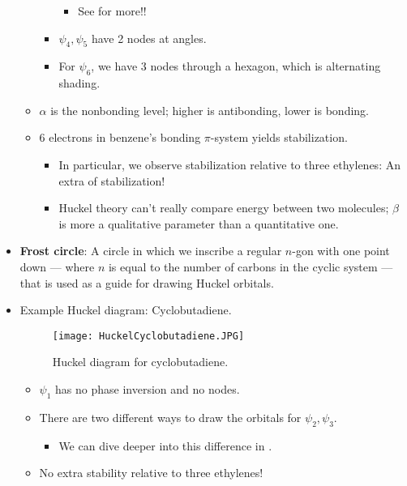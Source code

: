 \documentclass[../notes.tex]{subfiles}
\begin{document}
\begin{itemize}
\begin{itemize}
\begin{itemize}
            \begin{itemize}
                \item See \textcite{bib:Anslyn} for more!!
            \end{itemize}
            \item $\psi_4,\psi_5$ have 2 nodes at angles.
            \item For $\psi_6$, we have 3 nodes through a hexagon, which is alternating shading.
        \end{itemize}
        \item $\alpha$ is the nonbonding level; higher is antibonding, lower is bonding.
        \item 6 electrons in benzene's bonding $\pi$-system yields stabilization.
        \begin{itemize}
            \item In particular, we observe stabilization relative to three ethylenes: An extra  of stabilization!
            \item Huckel theory can't really compare energy between two molecules; $\beta$ is more a qualitative parameter than a quantitative one.
        \end{itemize}
    \end{itemize}
    \item \textbf{Frost circle}: A circle in which we inscribe a regular $n$-gon with one point down --- where $n$ is equal to the number of carbons in the cyclic system --- that is used as a guide for drawing Huckel orbitals.
    \item Example Huckel diagram: Cyclobutadiene.
    \begin{figure}[h!]
        \centering
        \texttt{[image: HuckelCyclobutadiene.JPG]}
        \caption{Huckel diagram for cyclobutadiene.}
        \label{fig:HuckelCyclobutadiene}
    \end{figure}
    \begin{itemize}
        \item $\psi_1$ has no phase inversion and no nodes.
        \item There are two different ways to draw the orbitals for $\psi_2,\psi_3$.
        \begin{itemize}
            \item We can dive deeper into this difference in \textcite{bib:Anslyn}.
        \end{itemize}
        \item No extra stability relative to three ethylenes!

\end{itemize}
\end{itemize}
\end{document}
